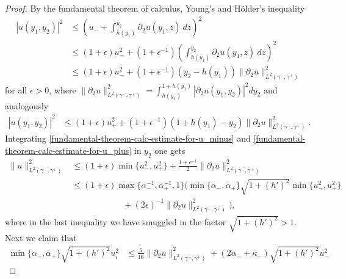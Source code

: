 \documentclass{article}
\theoremstyle{definition}
\theoremstyle{definition}
\begin{document}
\begin{proof}
By the fundamental theorem of calculus, Young's and Hölder's inequality
\begin{equation}
    \label{fundamental-theorem-calc-estimate-for-u_minus}
    \begin{aligned}
        |u(y_1,y_2)|^2&\leq \left(u_- +\int_{h(y_1)}^{y_2} \partial_2 u(y_1,z) \ dz\right)^2
        \\
        &\leq (1+\epsilon) u_-^2 + (1+\epsilon^{-1}) \left(\int_{h(y_1)}^{y_2} \partial_2 u(y_1,z) \ dz\right)^2
        \\
        &\leq (1+\epsilon) u_-^2 + (1+\epsilon^{-1}) (y_2-h(y_1)) \|\partial_2 u \|_{L^2(\gamma^-,\gamma^+)}^2
    \end{aligned}
\end{equation}
for all $\epsilon>0$, where $\|\partial_2 u\|_{L^2(\gamma^-,\gamma^+)}^2=\int_{h(y_1)}^{1+h(y_1)}|\partial_2u(y_1,y_2)|^2 dy_2$ and analogously
\begin{align}
    \label{fundamental-theorem-calc-estimate-for-u_plus}
    |u(y_1,y_2)|^2
    &\leq (1+\epsilon) u_+^2 + (1+\epsilon^{-1}) (1+h(y_1)-y_2) \|\partial_2 u \|_{L^2(\gamma^-,\gamma^+)}^2.
\end{align}
Integrating \eqref{fundamental-theorem-calc-estimate-for-u_minus} and \eqref{fundamental-theorem-calc-estimate-for-u_plus} in $y_2$ one gets
\begin{equation}
    \label{u-estimated-by-bdry-and-grad}
    \begin{aligned}
        \|u\|_{L^2(\gamma^-,\gamma^+)}^2 &\leq (1+\epsilon) \min \lbrace u_-^2,u_+^2 \rbrace +\frac{1+\epsilon^{-1}}{2} \|\partial_2 u\|_{L^2(\gamma^-,\gamma^+)}^2
        \\
        &\leq (1+\epsilon) \max\lbrace \alpha_-^{-1}, \alpha_+^{-1}, 1 \rbrace \Big( \min\lbrace \alpha_-, \alpha_+\rbrace \sqrt{1+(h')^2}\min\lbrace u_-^2,u_+^2 \rbrace 
        \\
        &\qquad\qquad\qquad  + (2\epsilon)^{-1} \|\partial_2 u\|_{L^2(\gamma^-,\gamma^+)}^2\Big),
    \end{aligned}
\end{equation}
where in the last inequality we have smuggled in the factor $\sqrt{1+(h')^2}>1$. Next we claim that
\begin{equation}
    \label{energy-decay-kappa-removed-estimate}
    \begin{aligned}
        \min\lbrace\alpha_-,\alpha_+\rbrace \sqrt{1+(h')^2}u_{i}^2
        &
        \leq \frac{5}{16}\|\partial_2 u\|_{L^2(\gamma^-,\gamma^+)}^2 + (2\alpha_-+\kappa_-)\sqrt{1+(h')^2}u_-^2

\end{aligned}
\end{equation}
\end{proof}
\end{document}

